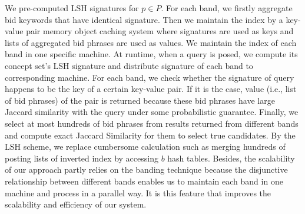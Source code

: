We pre-computed LSH signatures for $p\in{}P$.%
For each band, we firstly aggregate bid keywords that have identical signature.
Then we maintain the index by a key-value pair memory object caching
system where signatures are used as keys and lists of
aggregated bid phrases are used as values.
We maintain the index of each band in one specific machine.
At runtime, when a query is posed, we compute its concept set's LSH
signature and distribute signature of each band to corresponding machine.
For each band, we check whether the signature of query happens to be
the key of a certain key-value pair.
If it is the case, value (i.e., list of bid phrases) of the pair is
returned because these bid phrases have large Jaccard similarity with
the query under some probabilistic guarantee.
Finally, we select at most hundreds of bid phrases from results
returned from different bands and compute exact Jaccard Similarity for
them to select true candidates.
By the LSH scheme, we replace cumbersome calculation such as merging
hundreds of posting lists of inverted index by %
accessing $b$ hash tables.
Besides, the scalability of our approach partly relies on the banding
technique because the disjunctive relationship between different bands enables
us to maintain each band in one machine and process in a parallel way.
It is this feature that improves the scalability and efficiency of our
system.
